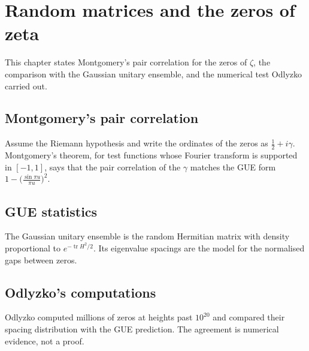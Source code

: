 \chapter{Random matrices and the zeros of zeta}\label{ch:oc-gue}

This chapter states Montgomery's pair correlation for the zeros of $\zeta$, the comparison with the Gaussian unitary ensemble, and the numerical test Odlyzko carried out.

\section{Montgomery's pair correlation}

Assume the Riemann hypothesis and write the ordinates of the zeros as $\frac12+i\gamma$. Montgomery's theorem, for test functions whose Fourier transform is supported in $[-1,1]$, says that the pair correlation of the $\gamma$ matches the GUE form $1-\bigl(\frac{\sin\pi u}{\pi u}\bigr)^2$.

\section{GUE statistics}

The Gaussian unitary ensemble is the random Hermitian matrix with density proportional to $e^{-\operatorname{tr} H^2/2}$. Its eigenvalue spacings are the model for the normalised gaps between zeros.

\section{Odlyzko's computations}

Odlyzko computed millions of zeros at heights past $10^{20}$ and compared their spacing distribution with the GUE prediction. The agreement is numerical evidence, not a proof.
